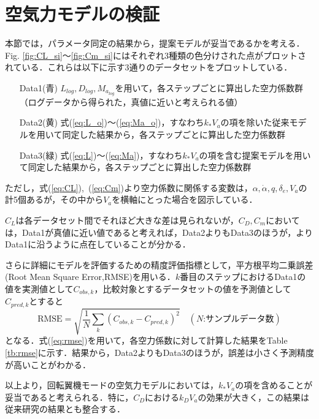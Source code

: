 \section{空気力モデルの検証}
\label{sec:airf_model_ver}

本節では，パラメータ同定の結果から，提案モデルが妥当であるかを考える．Fig. \ref{fig:CL_si}〜\ref{fig:Cm_si}にはそれぞれ3種類の色分けされた点がプロットされている．これらは以下に示す3通りのデータセットをプロットしている．

\begin{itemize}
  \setlength{\leftskip}{1.0cm}
  \setlength{\rightskip}{0.5cm}
  \item[Data1(青)] $L_{log},D_{log},M_{a_{log}}$を用いて，各ステップごとに算出した空力係数群\\（ログデータから得られた，真値に近いと考えられる値）
  \item[Data2(黄)] 式(\ref{eq:L_o})〜(\ref{eq:Ma_o})，すなわち$k_* V_a$の項を除いた従来モデルを用いて同定した結果から，各ステップごとに算出した空力係数群
  \item[Data3(緑)] 式(\ref{eq:L})〜(\ref{eq:Ma})，すなわち$k_* V_a$の項を含む提案モデルを用いて同定した結果から，各ステップごとに算出した空力係数群
\end{itemize}

ただし，式(\ref{eq:CL}),~(\ref{eq:Cm})より空力係数に関係する変数は，$\alpha,\dot{\alpha},q,\delta_e,V_a$の計5個あるが，その中から$V_a$を横軸にとった場合を図示している．

$C_L$は各データセット間でそれほど大きな差は見られないが，$C_D,C_m$においては，Data1が真値に近い値であると考えれば，Data2よりもData3のほうが，よりData1に沿うように点在していることが分かる．

さらに詳細にモデルを評価するための精度評価指標として，平方根平均二乗誤差(Root Mean Square Error,RMSE)を用いる．$k$番目のステップにおけるData1の値を実測値として$C_{obs,k}$，比較対象とするデータセットの値を予測値として$C_{pred,k}$とすると
\begin{equation}
  \mbox{RMSE} = \sqrt{\dfrac{1}{N}\sum_{k}(C_{obs,k}-C_{pred,k})^{2}} \quad (N\mbox{:サンプルデータ数})
  \label{eq:rmse}
\end{equation}
となる．式(\ref{eq:rmse})を用いて，各空力係数に対して計算した結果をTable \ref{tb:rmse}に示す．結果から，Data2よりもData3のほうが，誤差は小さく予測精度が高いことがわかる．

以上より，回転翼機モードの空気力モデルにおいては，$k_* V_a$の項を含めることが妥当であると考えられる．特に，$C_D$における$k_D V_a$の効果が大きく，この結果は従来研究\cite{yoshimura}の結果とも整合する．

